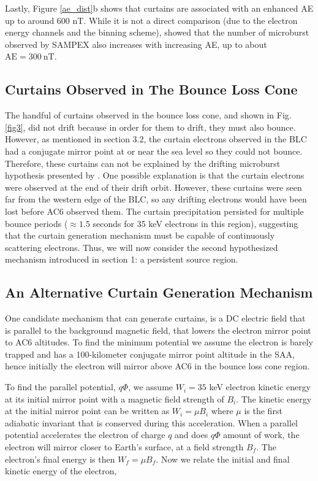 \documentclass[draft]{agujournal2019}
\begin{document}
Lastly, Figure \ref{ae_dist}b shows that curtains are associated with an enhanced AE up to around 600 nT. While it is not a direct comparison (due to the electron energy channels and the binning scheme),  showed that the number of microburst observed by SAMPEX also increases with increasing AE, up to about $\mathrm{AE} = 300 \ \mathrm{nT}$.
 
\subsection{Curtains Observed in The Bounce Loss Cone}
The handful of curtains observed in the bounce loss cone, and shown in Fig. \ref{fig3}, did not drift because in order for them to drift, they must also bounce. However, as mentioned in section 3.2, the curtain electrons observed in the BLC had a conjugate mirror point at or near the sea level so they could not bounce. Therefore, these curtains can not be explained by the drifting microburst hypothesis presented by . One possible explanation is that the curtain electrons were observed at the end of their drift orbit. However, these curtains were seen far from the western edge of the BLC, so any drifting electrons would have been lost before AC6 observed them. The curtain precipitation persisted for multiple bounce periods ($\approx 1.5$ seconds for 35 keV electrons in this region), suggesting that the curtain generation mechanism must be capable of continuously scattering electrons. Thus, we will now consider the second hypothesized mechanism introduced in section 1: a persistent source region.

\subsection{An Alternative Curtain Generation Mechanism}
One candidate mechanism that can generate curtains, is a DC electric field that is parallel to the background magnetic field, that lowers the electron mirror point to AC6 altitudes. To find the minimum potential we assume the electron is barely trapped and has a 100-kilometer conjugate mirror point altitude in the SAA, hence initially the electron will mirror above AC6 in the bounce loss cone region. 

To find the parallel potential, $q \Phi$,  we assume $W_i=35$ keV electron kinetic energy at its initial mirror point with a magnetic field strength of $B_i$. The kinetic energy at the initial mirror point can be written as $W_i = \mu B_i$ where $\mu$ is the first adiabatic invariant that is conserved during this acceleration. When a parallel potential accelerates the electron of charge $q$ and does $q \Phi$ amount of work, the electron will mirror closer to Earth's surface, at a field strength $B_f$. The electron's final energy is then $W_f = \mu B_f$. Now we relate the initial and final kinetic energy of the electron,
\end{document}
